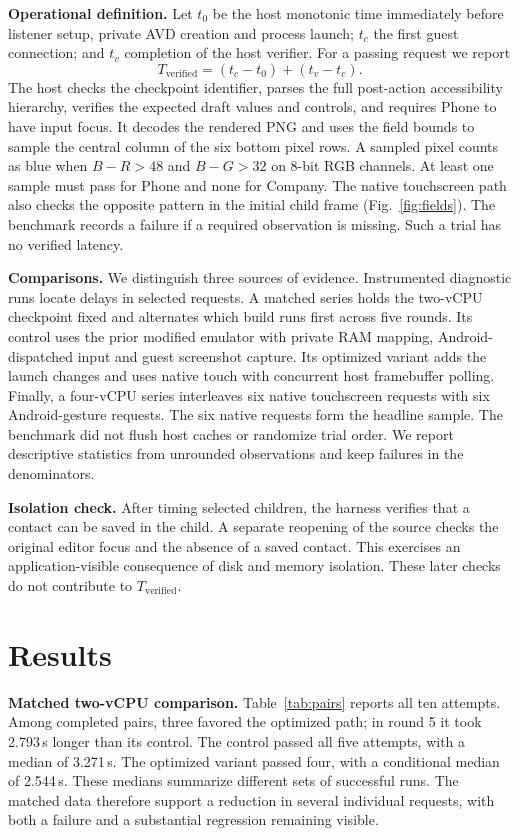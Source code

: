 \documentclass[11pt,letterpaper]{article}
\newcommand{\unit}[1]{#1\,s}
\newcommand{\subhead}[1]{\par\smallskip\noindent\textbf{#1}\enspace}
\begin{document}
\subhead{Operational definition.}
Let $t_0$ be the host monotonic time immediately before listener setup, private AVD creation and process launch; $t_c$ the first guest connection; and $t_v$ completion of the host verifier. For a passing request we report
\[
 T_{\mathrm{verified}} = (t_c-t_0) + (t_v-t_c).
\]
The host checks the checkpoint identifier, parses the full post-action accessibility hierarchy, verifies the expected draft values and controls, and requires Phone to have input focus. It decodes the rendered PNG and uses the field bounds to sample the central column of the six bottom pixel rows. A sampled pixel counts as blue when $B-R>48$ and $B-G>32$ on 8-bit RGB channels. At least one sample must pass for Phone and none for Company. The native touchscreen path also checks the opposite pattern in the initial child frame (Fig.~\ref{fig:fields}). The benchmark records a failure if a required observation is missing. Such a trial has no verified latency.

\subhead{Comparisons.}
We distinguish three sources of evidence. Instrumented diagnostic runs locate delays in selected requests. A matched series holds the two-vCPU checkpoint fixed and alternates which build runs first across five rounds. Its control uses the prior modified emulator with private RAM mapping, Android-dispatched input and guest screenshot capture. Its optimized variant adds the launch changes and uses native touch with concurrent host framebuffer polling. Finally, a four-vCPU series interleaves six native touchscreen requests with six Android-gesture requests. The six native requests form the headline sample. The benchmark did not flush host caches or randomize trial order. We report descriptive statistics from unrounded observations and keep failures in the denominators.

\subhead{Isolation check.}
After timing selected children, the harness verifies that a contact can be saved in the child. A separate reopening of the source checks the original editor focus and the absence of a saved contact. This exercises an application-visible consequence of disk and memory isolation. These later checks do not contribute to $T_{\mathrm{verified}}$.

\clearpage
\section{Results}
\subhead{Matched two-vCPU comparison.}
Table~\ref{tab:pairs} reports all ten attempts. Among completed pairs, three favored the optimized path; in round 5 it took \unit{2.793} longer than its control. The control passed all five attempts, with a median of \unit{3.271}. The optimized variant passed four, with a conditional median of \unit{2.544}. These medians summarize different sets of successful runs. The matched data therefore support a reduction in several individual requests, with both a failure and a substantial regression remaining visible.
\end{document}
